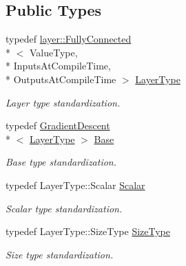 \subsection*{Public Types}
\begin{DoxyCompactItemize}
\item 
typedef \hyperlink{classffnn_1_1layer_1_1_fully_connected}{layer\-::\-Fully\-Connected}\\*
$<$ Value\-Type, \\*
Inputs\-At\-Compile\-Time, \\*
Outputs\-At\-Compile\-Time $>$ \hyperlink{classffnn_1_1optimizer_1_1_adam_3_01layer_1_1_fully_connected_3_01_value_type_00_01_inputs_at_co08ce471fd3ee7441a350cc42cfd35bcd_ad82ece03afb695075874eaed356433d2}{Layer\-Type}
\begin{DoxyCompactList}\small\item\em Layer type standardization. \end{DoxyCompactList}\item 
typedef \hyperlink{classffnn_1_1optimizer_1_1_gradient_descent}{Gradient\-Descent}\\*
$<$ \hyperlink{classffnn_1_1optimizer_1_1_adam_3_01layer_1_1_fully_connected_3_01_value_type_00_01_inputs_at_co08ce471fd3ee7441a350cc42cfd35bcd_ad82ece03afb695075874eaed356433d2}{Layer\-Type} $>$ \hyperlink{classffnn_1_1optimizer_1_1_adam_3_01layer_1_1_fully_connected_3_01_value_type_00_01_inputs_at_co08ce471fd3ee7441a350cc42cfd35bcd_aa039b3368a2997e3437a32da6ef4a373}{Base}
\begin{DoxyCompactList}\small\item\em Base type standardization. \end{DoxyCompactList}\item 
typedef Layer\-Type\-::\-Scalar \hyperlink{classffnn_1_1optimizer_1_1_adam_3_01layer_1_1_fully_connected_3_01_value_type_00_01_inputs_at_co08ce471fd3ee7441a350cc42cfd35bcd_a966519516e8af4fcb6d58840a7d1d12a}{Scalar}
\begin{DoxyCompactList}\small\item\em Scalar type standardization. \end{DoxyCompactList}\item 
typedef Layer\-Type\-::\-Size\-Type \hyperlink{classffnn_1_1optimizer_1_1_adam_3_01layer_1_1_fully_connected_3_01_value_type_00_01_inputs_at_co08ce471fd3ee7441a350cc42cfd35bcd_a6bbc6e181e5a5192b7b5cc42e3172372}{Size\-Type}
\begin{DoxyCompactList}\small\item\em Size type standardization. \end{DoxyCompactList}\item 

\end{DoxyCompactItemize}
